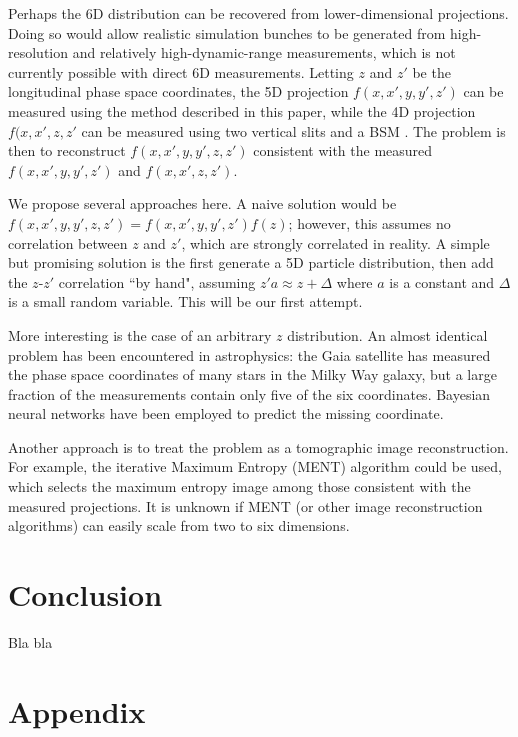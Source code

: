 \documentclass[letterpaper,
               keeplastbox,
               nospread,
               biblatex,
              ]{jacow}
\begin{document}
Perhaps the 6D distribution can be recovered from lower-dimensional projections. Doing so would allow realistic simulation bunches to be generated from high-resolution and relatively high-dynamic-range measurements, which is not currently possible with direct 6D measurements. Letting $z$ and $z'$ be the longitudinal phase space coordinates, the 5D projection $f(x, x', y, y', z')$ can be measured using the method described in this paper, while the 4D projection $f(x, x', z, z'$ can be measured using two vertical slits and a BSM \cite{Ruisard2021-long}. The problem is then to reconstruct $f(x, x', y, y', z, z')$ consistent with the measured $f(x, x', y, y', z')$ and $f(x, x', z, z')$. 

We propose several approaches here. A naive solution would be $f(x, x', y, y', z, z') = f(x, x', y, y', z') f(z)$; however, this assumes no correlation between $z$ and $z'$, which are strongly correlated in reality. A simple but promising solution is the first generate a 5D particle distribution, then add the $z$-$z'$ correlation ``by hand", assuming $z' a\approx z + \Delta$ where $a$ is a constant and $\Delta$ is a small random variable. This will be our first attempt.

More interesting is the case of an arbitrary $z$ distribution. An almost identical problem has been encountered in astrophysics: the Gaia satellite has measured the phase space coordinates of many stars in the Milky Way galaxy, but a large fraction of the measurements contain only five of the six coordinates. Bayesian neural networks have been employed to predict the missing coordinate. 

Another approach is to treat the problem as a tomographic image reconstruction. For example, the iterative Maximum Entropy (MENT) algorithm could be used, which selects the maximum entropy image among those consistent with the measured projections. It is unknown if MENT (or other image reconstruction algorithms) can easily scale from two to six dimensions.


\section{Conclusion}

Bla bla

\section{Appendix}\label{app:A}


\printbibliography
\end{document}
